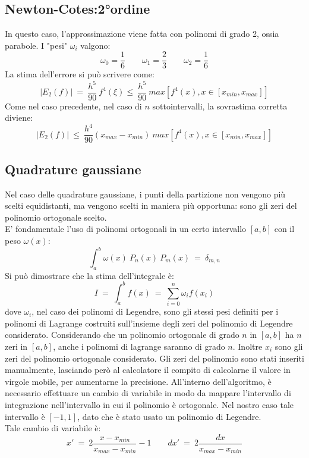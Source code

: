 \subsection{Newton-Cotes:2°ordine}
In questo caso, l'approssimazione viene fatta con polinomi di grado 2, ossia parabole.
I "pesi" $\omega_i$ valgono:
$$
	\omega_0 = \frac{1}{6} \qquad  \omega_1 = \frac{2}{3} \qquad \omega_2 = \frac{1}{6}
$$
La stima dell'errore si può scrivere come:
$$
|E_2 (f) | \ = \  \frac{h^5}{90} \ f^4(\xi) \leq \ \frac{h^5}{90} \ max \left[ f^4( x), x \in [x_{min},x_{max}] \right]
$$
Come nel caso precedente, nel caso di $n$ sottointervalli, la sovrastima corretta diviene:
$$
|E_2 (f) | \ \leq \ \frac{h^4}{90} \left( x_{max} - x_{min} \right) \ max \left[ f^4( x), x \in [x_{min},x_{max}] \right]
$$

\subsection{Quadrature gaussiane}
Nel caso delle quadrature gaussiane, i punti della partizione non vengono più scelti equidistanti,
ma vengono scelti in maniera più opportuna: sono gli zeri del polinomio ortogonale scelto.\\
E' fondamentale l'uso di polinomi ortogonali in un certo intervallo $[a,b]$ con il peso $\omega(x)$:
$$
	\int_a^b \omega(x)\ P_n{(x)} \ P_m{(x)} \ = \ \delta_{m,n}
$$
Si può dimostrare che la stima dell'integrale è:
$$
 I \ = \  \int_a^b f(x) \ = \ \sum_{i=0}^n \omega_i f(x_i)
$$
dove $\omega_i$, nel caso dei polinomi di Legendre, sono gli stessi pesi definiti per i polinomi di Lagrange costruiti sull'insieme degli zeri
del polinomio di Legendre considerato. Considerando che un polinomio ortogonale di grado $n$ in $[a,b]$ ha $n$ zeri in $[a,b]$, anche i polinomi
di lagrange saranno di grado $n$. Inoltre $x_i$ sono gli zeri del polinomio ortogonale considerato.
Gli zeri del polinomio sono stati inseriti manualmente, lasciando però al calcolatore il compito di calcolarne il valore in virgole mobile,
per aumentarne la precisione.
All'interno dell'algoritmo, è necessario effettuare un cambio di variabile in modo da mappare l'intervallo
di integrazione nell'intervallo in cui il polinomio è ortogonale. Nel nostro caso tale intervallo è $[-1,1]$,
dato che è stato usato un polinomio di Legendre.\\
Tale cambio di variabile è:
$$
	x' \ = \ 2 \frac{x - x_{min} }{x_{max}-x_{min}} - 1 \qquad dx'  \ = \ 2 \frac{dx}{x_{max}-x_{min}}
$$
